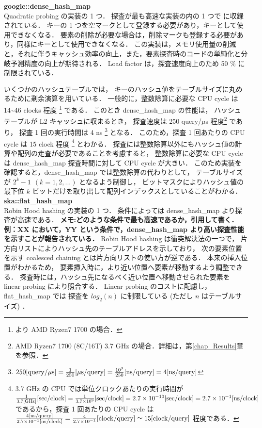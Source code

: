 {\bf google::dense\_hash\_map}
\samepage \\ \indent
Quadratic probing の実装の 1 つ．
探査が最も高速な実装の内の 1 つで \cite{sparsehash2005}に収録されている．
キーの 1 つを空マークとして登録する必要があり，キーとして使用できなくなる．
要素の削除が必要な場合は，削除マークも登録する必要があり，同様にキーとして使用できなくなる．
この実装は，メモリ使用量の削減と，それに伴うキャッシュ効率の向上，また，要素探査時のコードの単純化と分岐予測精度の向上が期待される．
Load factor は，探査速度向上のため 50 \% に制限されている．

いくつかのハッシュテーブルでは，
キーのハッシュ値をテーブルサイズに丸めるために剰余演算を用いている．
一般的に，整数除算に必要な CPU cycle は 14\textasciitilde 46 clocks 程度
\footnote{
  \cite{AgnerFog2018}より AMD Ryzen7 1700 の場合．
} である．
このとき dense\_hash\_map の性能は，
ハッシュテーブルが L2 キャッシュに収まるとき，
探査速度は 250 query/$\mu$s 程度\footnote{AMD Ryzen7 1700 (8C/16T) 3.7 GHz の場合．詳細は，第\ref{chap_Results}章を参照．} であり，
探査 1 回の実行時間は 4 ns
\footnote{
  $
    250{\rm [query \slash \mu s]}
    = \frac{1}{250} {\rm [\mu s \slash query]}
    = \frac{10^3}{250} {\rm [ns \slash query]}
    = 4 {\rm [ns \slash query]}
  $
} となる．
このため，探査 1 回あたりの CPU cycle は 15 clock 程度
\footnote{
  3.7 GHz の CPU では単位クロックあたりの実行時間が
  $
    \frac{1}{3.7 {\rm [GHz]}}{\rm [sec/clock]}
    = \frac{1}{3.7 \times 10^9}{\rm [sec/clock]}
    = 2.7 \times 10^{-10}{\rm [sec/clock]}
    = 2.7 \times 10^{-1}{\rm [ns/clock]}
  $
  であるから，探査 1 回あたりの CPU cycle は
  $
    \frac{ 4 {\rm [ns/query]} }{ 2.7 \times 10^{-1} {\rm [ns/clock]} }
    = \frac{ 4 }{ 2.7 \times 10^{-1} } {\rm [clock/query]}
    \simeq 15 {\rm [clock/query]}
  $
  程度である．
} とわかる．
探査には整数除算以外にもハッシュ値の計算や配列の走査が必要であることを考慮すると，
整数除算に必要な CPU cycle は dense\_hash\_map 探査時間に対して CPU cycle が大きい．
このため実装を確認すると，dense\_hash\_map では整数除算の代わりとして，
テーブルサイズが $2^k-1\ \ (k=1,2,...)$ となるよう制御し，
ビットマスクによりハッシュ値の最下位 $k$ ビットだけを取り出して配列インデックスとしていることがわかる．
\\

{\bf ska::flat\_hash\_map}
\samepage \\ \indent
Robin Hood hashing の実装の 1 つ．
条件によっては dense\_hash\_map より探査が高速である．
{\bf \color{red}メモ:どのような条件で最も高速であるか，引用して書く．例：XX において，YY という条件で，dense\_hash\_map より高い探査性能を示すことが報告されている．}
Robin Hood hashing は衝突解決法の一つで，
片方向リストによりハッシュ先のテーブルアドレスを示しており，
次の要素位置を示す coalesced chaining とは片方向リストの使い方が逆である．
本来の挿入位置がわかるため，
要素挿入時に，より近い位置へ要素が移動するよう調整できる．
探査時には，ハッシュ先になるべく近い位置へ移動させられた要素を linear probing により照合する．
Linear probing のコストに配慮し，flat\_hash\_map では
探査を $log_2(n)$ に制限している (ただし $n$ はテーブルサイズ) \citep{Skarupke2017}．

